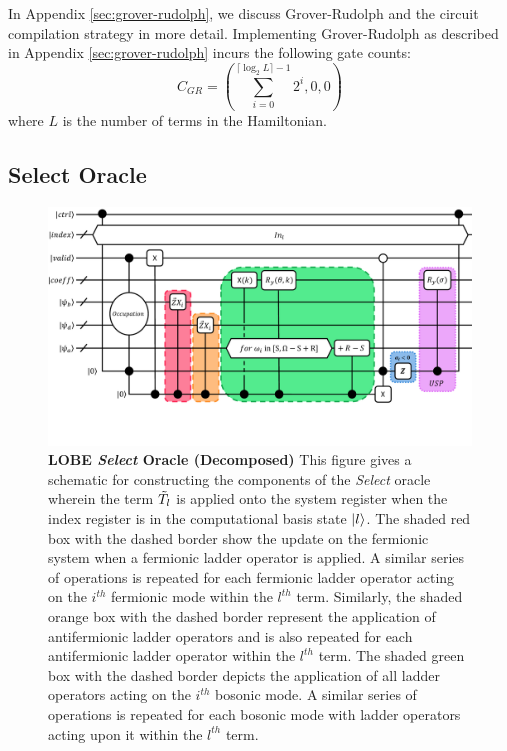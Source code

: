In Appendix \ref{sec:grover-rudolph}, we discuss Grover-Rudolph and the circuit compilation strategy in more detail.
Implementing Grover-Rudolph as described in Appendix \ref{sec:grover-rudolph} incurs the following gate counts:
\begin{equation}
    C_{GR} = (\sum_{i=0}^{\lceil \log_2{L} \rceil - 1} 2^i, 0, 0)
\end{equation}
where $L$ is the number of terms in the Hamiltonian.

\subsection{Select Oracle}
\label{subsec:select}

\begin{figure}
    \centering
    \includegraphics[width=16cm]{figures/select.pdf}
    \caption{
        \textbf{LOBE \textit{Select} Oracle (Decomposed)}
        This figure gives a schematic for constructing the components of the \textit{Select} oracle wherein the term $\Tilde{T_l}$ is applied onto the system register when the index register is in the computational basis state $\ket{l}$.
        The shaded red box with the dashed border show the update on the fermionic system when a fermionic ladder operator is applied.
        A similar series of operations is repeated for each fermionic ladder operator acting on the $i^{th}$ fermionic mode within the $l^{th}$ term.
        Similarly, the shaded orange box with the dashed border represent the application of antifermionic ladder operators and is also repeated for each antifermionic ladder operator within the $l^{th}$ term.
        The shaded green box with the dashed border depicts the application of all ladder operators acting on the $i^{th}$ bosonic mode.
        A similar series of operations is repeated for each bosonic mode with ladder operators acting upon it within the $l^{th}$ term.
}
\end{figure}
